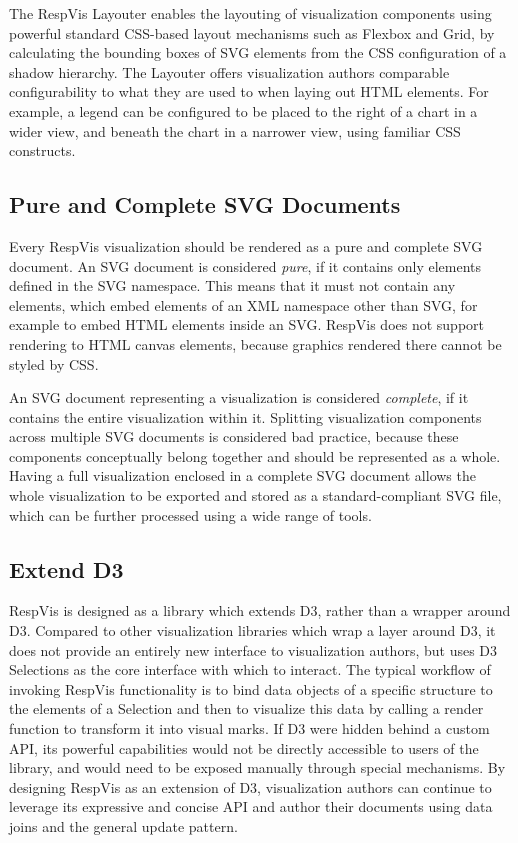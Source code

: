 The RespVis Layouter enables the layouting of visualization components
using powerful standard CSS-based layout mechanisms such as Flexbox
and Grid, by calculating the bounding boxes of SVG elements from the
CSS configuration of a shadow  hierarchy. The Layouter
offers visualization authors comparable configurability to what they
are used to when laying out HTML elements. For example, a legend can
be configured to be placed to the right of a chart in a wider view,
and beneath the chart in a narrower view, using familiar CSS
constructs.





\subsection{Pure and Complete SVG Documents}

Every RespVis visualization should be rendered as a pure and complete
SVG document. An SVG document is considered \emph{pure}, if it
contains only elements defined in the SVG namespace. This means that
it must not contain any  elements, which embed
elements of an XML namespace other than SVG, for example to embed HTML
elements inside an SVG. RespVis does not support rendering to HTML
canvas elements, because graphics rendered there cannot be styled by
CSS.

An SVG document representing a visualization is considered
\emph{complete}, if it contains the entire visualization within
it. Splitting visualization components across multiple SVG documents
is considered bad practice, because these components conceptually
belong together and should be represented as a whole. Having
a full visualization enclosed in a complete SVG document allows the
whole visualization to be exported and stored as a standard-compliant
SVG file, which can be further processed using a wide range of tools.




\subsection{Extend D3}

RespVis is designed as a library which extends D3, rather than a
wrapper around D3. Compared to other visualization libraries which
wrap a layer around D3, it does not provide an entirely new interface
to visualization authors, but uses D3 Selections as the core interface
with which to interact. The typical workflow of invoking RespVis
functionality is to bind data objects of a specific structure to the
elements of a Selection and then to visualize this data by calling a
render function to transform it into visual marks. If D3 were hidden
behind a custom API, its powerful capabilities would not be directly
accessible to users of the library, and would need to be exposed
manually through special mechanisms. By designing RespVis as an
extension of D3, visualization authors can continue to leverage its
expressive and concise API and author their documents using data joins
and the general update pattern.



